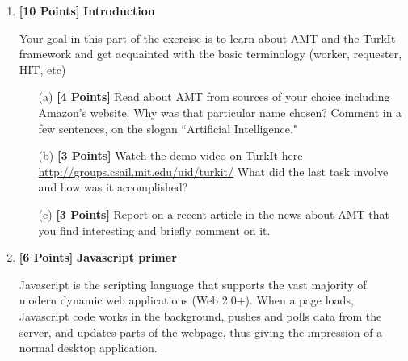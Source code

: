 \documentclass[11pt]{article}
\newcommand{\points}[1]{\textbf{[#1 Points]}}
\begin{document}
\begin{enumerate}
\item \points{10} {\bf Introduction}

Your goal in this part of the exercise is to learn about AMT and the TurkIt framework
and get acquainted with the basic terminology (worker, requester, HIT, etc)
\begin{enumerate}

\item[(a)] \points{4} Read about AMT from sources of your choice including Amazon's website. 
Why was that particular name chosen? Comment in a few sentences, on the slogan ``Artificial Intelligence." 
%
\item[(b)] \points{3} Watch the demo video on TurkIt here \url{http://groups.csail.mit.edu/uid/turkit/} What did the last task involve and how was it accomplished?
%
\item[(c)] \points{3} Report on a recent article in 
the news about AMT that you find interesting 
and briefly comment on it. 
\end{enumerate}


\item \points{6} {\bf Javascript primer }

Javascript is the scripting language that supports the vast majority
of modern dynamic web applications (Web 2.0+). When a page loads,
Javascript code works in the background, pushes and polls data from
the server, and updates parts of the webpage, thus giving the
impression of a normal desktop application.


\end{enumerate}
\end{document}
